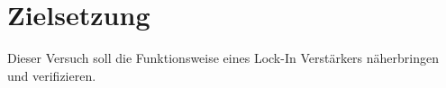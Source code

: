 \section{Zielsetzung}
\label{sec:Zielsetzung}


Dieser Versuch soll die Funktionsweise eines Lock-In Verstärkers näherbringen und verifizieren.